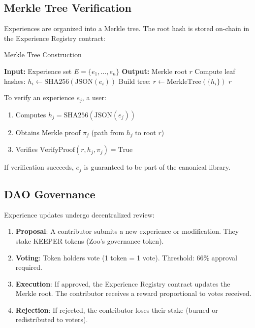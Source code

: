 \documentclass[11pt,a4paper]{article}
\begin{document}
\subsection{Merkle Tree Verification}

Experiences are organized into a Merkle tree. The root hash is stored on-chain in the Experience Registry contract:

\begin{algorithm}[H]
\caption{Merkle Tree Construction}
\begin{algorithmic}[1]
\STATE \textbf{Input:} Experience set $E = \{e_1, \ldots, e_n\}$
\STATE \textbf{Output:} Merkle root $r$
\STATE Compute leaf hashes: $h_i \leftarrow \text{SHA256}(\text{JSON}(e_i))$
\STATE Build tree: $r \leftarrow \text{MerkleTree}(\{h_i\})$
\RETURN $r$
\end{algorithmic}
\end{algorithm}

To verify an experience $e_j$, a user:
\begin{enumerate}
\item Computes $h_j = \text{SHA256}(\text{JSON}(e_j))$
\item Obtains Merkle proof $\pi_j$ (path from $h_j$ to root $r$)
\item Verifies $\text{VerifyProof}(r, h_j, \pi_j) = \text{True}$
\end{enumerate}

If verification succeeds, $e_j$ is guaranteed to be part of the canonical library.

\subsection{DAO Governance}

Experience updates undergo decentralized review:

\begin{enumerate}
\item \textbf{Proposal}: A contributor submits a new experience or modification. They stake KEEPER tokens (Zoo's governance token).
\item \textbf{Voting}: Token holders vote (1 token = 1 vote). Threshold: 66\% approval required.
\item \textbf{Execution}: If approved, the Experience Registry contract updates the Merkle root. The contributor receives a reward proportional to votes received.
\item \textbf{Rejection}: If rejected, the contributor loses their stake (burned or redistributed to voters).
\end{enumerate}
\end{document}
